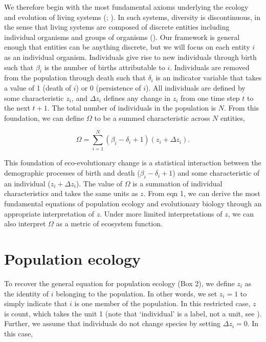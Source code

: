 \documentclass[
]{article}
\begin{document}
We therefore begin with the most fundamental axioms underlying the
ecology and evolution of living systems (; ). In such
systems, diversity is discontinuous, in the sense that living systems
are composed of discrete entities including individual organisms and
groups of organisms ().
Our framework is general enough that entities can be anything discrete,
but we will focus on each entity \(i\) as an individual organism.
Individuals give rise to new individuals through birth such that
\(\beta_{i}\) is the number of births attributable to \(i\). Individuals
are removed from the population through death such that \(\delta_{i}\)
is an indicator variable that takes a value of 1 (death of \(i\)) or 0
(persistence of \(i\)). All individuals are defined by some
characteristic \(z_{i}\), and \(\Delta z_{i}\) defines any change in
\(z_{i}\) from one time step \(t\) to the next \(t + 1\). The total
number of individuals in the population is \(N\). From this foundation,
we can define \(\Omega\) to be a summed characteristic across \(N\)
entities,

\[\Omega = \sum_{i=1}^{N} \left(\beta_{i} - \delta_{i} + 1 \right)\left(z_{i} + \Delta z_{i} \right).
\tag{1}
\]

This foundation of eco-evolutionary change is a statistical interaction
between the demographic processes of birth and death
(\(\beta_{i} - \delta_{i} + 1\)) and some characteristic of an
individual (\(z_{i} + \Delta z_{i}\)). The value of \(\Omega\) is a
summation of individual characteristics and takes the same units as
\(z\). From eqn 1, we can derive the most fundamental equations of
population ecology and evolutionary biology through an appropriate
interpretation of \(z\). Under more limited interpretations of \(z\), we
can also interpret \(\Omega\) as a metric of ecosystem function.

\section{Population ecology}\label{population-ecology}

To recover the general equation for population ecology (Box 2), we
define \(z_{i}\) as the identity of \(i\) belonging to the population.
In other words, we set \(z_{i} = 1\) to simply indicate that \(i\) is
one member of the population. In this restricted case, \(z\) is count,
which takes the unit 1 (note that `individual' is a label, not a unit,
see ). Further,
we assume that individuals do not change species by setting
\(\Delta z_{i} = 0\). In this case,
\end{document}
